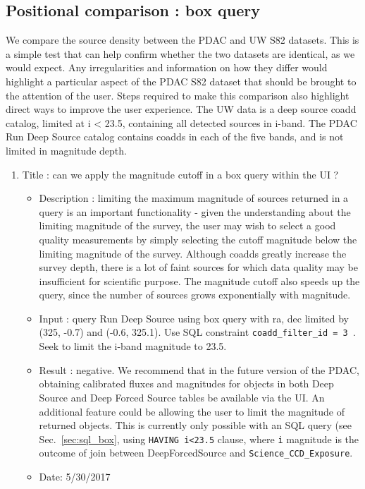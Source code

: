 \documentclass[DM,lsstdraft,toc]{lsstdoc}
\begin{document}
\subsection{Positional comparison : box query }

We compare the source density between the PDAC and UW S82 datasets.  This is a simple test that can help confirm whether the two datasets are identical, as we would expect. Any irregularities and information on  how they differ  would highlight a particular aspect of the PDAC S82 dataset that should be brought to the attention of the user.  Steps required to make this comparison also highlight direct ways to improve the user experience.   The UW data is a deep source coadd catalog, limited at i < 23.5, containing all detected sources in i-band.  The PDAC Run Deep Source catalog  contains coadds in each of the five bands,  and is not limited in magnitude depth.



\begin{enumerate}
   \item Title : can we apply the magnitude cutoff in a box query within the UI ?
    \begin{itemize}
      \item Description : limiting the maximum magnitude of sources returned in a query is an important functionality - given the understanding about the limiting magnitude of the survey, the user may wish to select a good quality measurements by simply selecting the cutoff magnitude below the limiting magnitude of the survey.  Although coadds greatly increase the survey depth,  there is a lot of faint sources for which data quality may be insufficient for scientific purpose. The magnitude cutoff also speeds up the query, since the number of sources grows exponentially with magnitude.
      \item Input : query Run Deep Source using box query with ra, dec limited by  (325, -0.7)  and (-0.6, 325.1). Use SQL constraint \verb|coadd_filter_id = 3 |. Seek to limit the i-band magnitude to 23.5.
      \item Result : negative.  We recommend that in the future version of the PDAC, obtaining calibrated fluxes and magnitudes for objects in  both Deep Source and Deep Forced Source tables be available via the UI.  An additional feature could be allowing the user to limit the magnitude of returned objects.  This is currently only possible with an SQL query (see Sec.~\ref{sec:sql_box}, using \verb|HAVING i<23.5| clause, where \verb|i| magnitude is the outcome of join between DeepForcedSource and \verb|Science_CCD_Exposure|.
      \item Date: 5/30/2017
    \end{itemize}
\end{enumerate}
\end{document}

